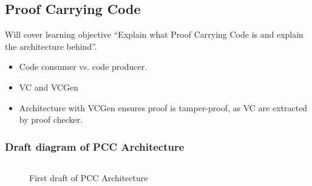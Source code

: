 \subsection{Proof Carrying Code}
\label{subsec:proof_carrying_code}

Will cover learning objective ``Explain what Proof Carrying Code is and explain the architecture behind''.

\begin{itemize}
\item 
Code consumer vs. code producer.
\item VC and VCGen
  \item Architecture with VCGen ensures proof is tamper-proof, as VC are extracted by proof checker.
\end{itemize}

\subsubsection*{Draft diagram of PCC Architecture}

\begin{figure}[htbp!]
  \centering
\inputminted{text}{figures/pcc-architecture.txt}
  \caption{First draft of PCC Architecture}
  \label{fig:pcc-architecture}
\end{figure}


